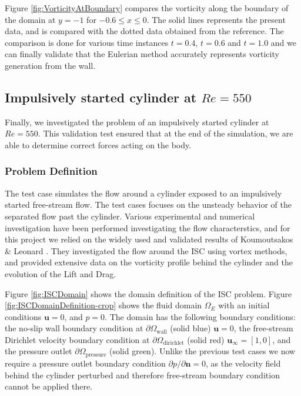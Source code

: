 Figure \ref{fig:VorticityAtBoundary} compares the vorticity along the boundary of the domain at $y=-1$ for $-0.6 \leqslant x \leqslant 0$. The solid lines represents the present data, and is compared with the dotted data obtained from the reference. The comparison is done for various time instances $t=0.4$, $t=0.6$ and $t=1.0$ and we can finally validate that the Eulerian method accurately represents vorticity generation from the wall.

\subsection{Impulsively started cylinder at $Re=550$}
\label{subsec:eul_isc}
Finally, we investigated the problem of an impulsively started cylinder at $Re=550$. This validation test ensured that at the end of the simulation, we are able to determine correct forces acting on the body. 

\subsubsection*{Problem Definition}
The  test case simulates the flow around a cylinder exposed to an impulsively started free-stream flow. The test cases focuses on the unsteady behavior of the separated flow past the cylinder. Various experimental and numerical investigation have been performed investigating the flow characterstics, and for this project we relied on the widely used and validated results of Koumoutsakos \& Leonard \cite{Koumoutsakos1995a}. They investigated the flow around the ISC using vortex methods, and provided extensive data on the vorticity profile behind the cylinder and the evolution of the Lift and Drag.

Figure \ref{fig:ISCDomain} shows the domain definition of the ISC problem. Figure \ref{fig:ISCDomainDefinition-crop} shows the fluid domain $\Omega_E$ with an initial conditions $\mathbf{u}=0$, and $p=0$. The domain has the following boundary conditions: the no-slip wall boundary condition at $\partial \Omega_{\mathrm{wall}}$ (solid blue) $\mathbf{u}=0$, the free-stream Dirichlet velocity boundary condition at $\partial \Omega_{\mathrm{dirichlet}}$ (solid red) $\mathbf{u}_{\infty} = [1,0]$, and the pressure outlet $\partial \Omega_{\mathrm{pressure}}$ (solid green). Unlike the previous test cases we now require a pressure outlet boundary condition $\partial p/ \partial \mathbf{n} = 0$, as the velocity field behind the cylinder perturbed and therefore free-stream boundary condition cannot be applied there.

